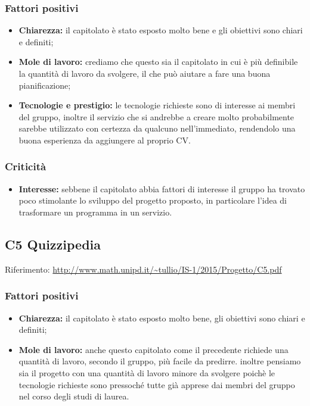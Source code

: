 \documentclass{scalatekids-article}
\begin{document}
\subsubsection{Fattori positivi}
\begin{itemize}
\item \textbf{Chiarezza:} il capitolato è stato esposto molto bene e gli obiettivi sono chiari e definiti;
\item \textbf{Mole di lavoro:} crediamo che questo sia il capitolato in cui è più definibile la quantità di lavoro da svolgere, il che può aiutare a fare una buona pianificazione;
\item \textbf{Tecnologie e prestigio:} le tecnologie richieste sono di interesse ai membri del gruppo, inoltre il servizio che si andrebbe a creare molto probabilmente sarebbe utilizzato con certezza da qualcuno nell'immediato, rendendolo una buona esperienza da aggiungere al proprio CV.
\end{itemize}
\subsubsection{Criticità}
\begin{itemize}
\item \textbf{Interesse:} sebbene il capitolato abbia fattori di interesse il gruppo ha trovato poco stimolante lo sviluppo del progetto proposto, in particolare l'idea di trasformare un programma in un servizio.
\end{itemize}

\subsection{C5 Quizzipedia}
Riferimento: \url{http://www.math.unipd.it/~tullio/IS-1/2015/Progetto/C5.pdf}\\
\subsubsection{Fattori positivi}
\begin{itemize}
\item \textbf{Chiarezza:} il capitolato è stato esposto molto bene, gli obiettivi sono chiari e definiti;
\item \textbf{Mole di lavoro:} anche questo capitolato come il precedente richiede una quantità di lavoro, secondo il gruppo, più facile da predirre. inoltre pensiamo sia il progetto con una quantità di lavoro minore da svolgere poichè le tecnologie richieste sono pressoché tutte già apprese dai membri del gruppo nel corso degli studi di laurea.
\end{itemize}
\end{document}
